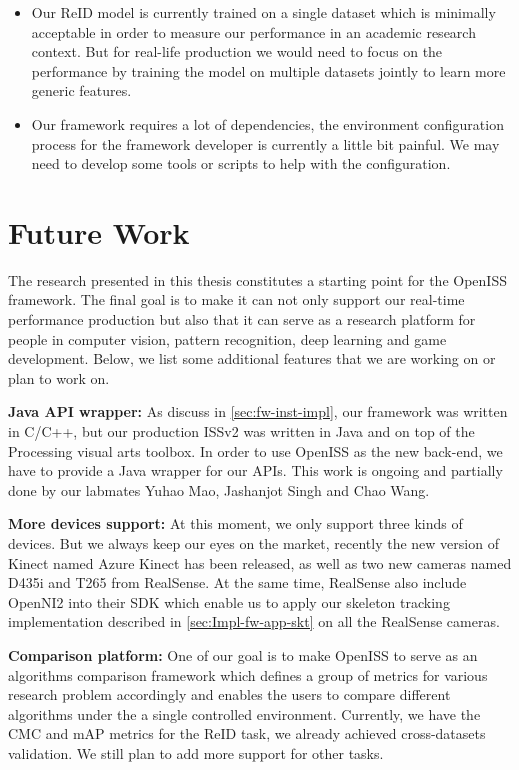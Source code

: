 \begin{itemize}
	\item Our ReID model is currently trained on a single dataset which is minimally 
	acceptable in order to measure our performance in an academic research context. 
	But for real-life production we would need to focus on the performance by training the
	model on multiple datasets jointly to learn more generic features.

	\item Our framework requires a lot of dependencies, the environment
	configuration process for the framework developer is currently a little bit
	painful. We may need to develop some tools or scripts to help with the
	configuration.
\end{itemize}

\section{Future Work}
\label{sec:Conclusion-future-work}

The research presented in this thesis constitutes a starting point for
the OpenISS framework. The final goal is to make it can not only support our
real-time performance production but also that it can serve as a research platform for
people in computer vision, pattern recognition, deep learning and game
development. Below, we list some additional features that we are working on or
plan to work on.

\textbf{Java API wrapper:} As discuss in \autoref{sec:fw-inst-impl}, our
framework was written in C/C++, but our production ISSv2 was written in Java
and on top of the Processing visual arts toolbox. In order to use OpenISS as the new back-end, we have
to provide a Java wrapper for our APIs. This work is ongoing and partially done
by our labmates Yuhao Mao, Jashanjot Singh and Chao Wang.

\textbf{More devices support:} At this moment, we only support three kinds of
devices. But we always keep our eyes on the market, recently the new version of
Kinect named Azure Kinect has been released, as well as two new cameras named
D435i and T265 from RealSense.
At the same time, RealSense also include OpenNI2 into their SDK which enable us
to apply our skeleton tracking implementation described in
\autoref{sec:Impl-fw-app-skt} on all the RealSense cameras.

\textbf{Comparison platform: } One of our goal is to make OpenISS to serve as
an algorithms comparison framework which defines a group of  metrics for various
research problem accordingly and enables the users to compare different
algorithms under the a single controlled environment. Currently, we have the CMC and mAP
metrics for the ReID task, we already achieved cross-datasets validation. We still
plan to add more support for other tasks.

